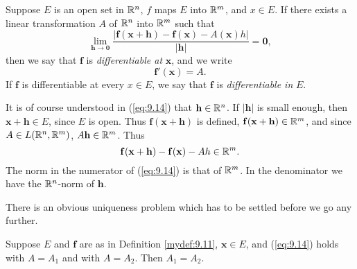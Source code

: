 \begin{mydef}
    \label{mydef:9.11}
    Suppose $E$ is an open set in ${\protect\mathbb R}^n$, $f$ maps $E$ into ${\protect\mathbb R}^m$, and $x \in E$.
    If there exists a linear transformation $A$ of ${\protect\mathbb R}^n$ into ${\protect\mathbb R}^m$ such that
    \begin{equation}
        \label{eq:9.14}
        \lim_{\mathbf{h} \to \mathbf{0}} \frac{\left| \mathbf{f}\mathbf{(x+h)} - \mathbf{f}\mathbf{(x)} - A\mathbf{(x)}h \right|}{\left| \mathbf{h} \right|} = \mathbf{0},
    \end{equation}
    then we say that $\mathbf{f}$ is \emph{differentiable at} $\mathbf{x}$, and we write
    \begin{equation}
        \label{eq:9.15}
        \mathbf{f}'(\mathbf{x}) = A.
    \end{equation}
    If $\mathbf{f}$ is differentiable at every $x \in E$,
    we say that $\mathbf{f}$ is \emph{differentiable in} $E$.
\end{mydef}

It is of course understood in (\ref{eq:9.14}) that $\mathbf{h} \in {\protect\mathbb R}^n$.
If $\left| \mathbf{h} \right|$ is small enough,
then $\mathbf{x+h} \in E$, since $E$ is open.
Thus $\mathbf{f(x + h)}$ is defined, $\mathbf{f(x + h)} \in {\protect\mathbb R}^m$,
and since $A \in L({\protect\mathbb R}^n, {\protect\mathbb R}^m)$, $A \mathbf{h} \in {\protect\mathbb R}^m$.
Thus
\begin{equation*}
    \mathbf{f(x + h)} - \mathbf{f(x)} - A{h} \in {\protect\mathbb R}^m.
\end{equation*}
The norm in the numerator of (\ref{eq:9.14}) is that of ${\protect\mathbb R}^m$.
In the denominator we have the ${\protect\mathbb R}^n$-norm of $\mathbf{h}$.

There is an obvious uniqueness problem which has to be settled before we go any further.

\begin{thm}
    \label{thm:9.12}
    Suppose $E$ and $\mathbf{f}$ are as in Definition \ref{mydef:9.11},
    $\mathbf{x} \in E$, and (\ref{eq:9.14}) holds with $A = A_1$ and with $A = A_2$.
    Then $A_1 = A_2$.
\end{thm}


